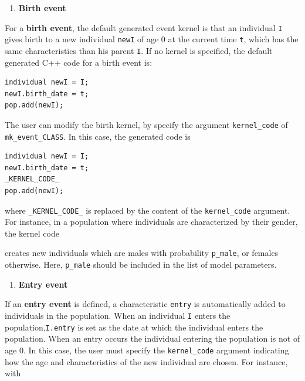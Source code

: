 \begin{enumerate}
\def\labelenumi{\arabic{enumi}.}
\setcounter{enumi}{2}
\tightlist
\item
  \textbf{Birth event}
\end{enumerate}

For a \textbf{birth event}, the default generated event kernel is that an individual \texttt{I} gives birth to a new individual \texttt{newI} of age 0 at the current time \texttt{t}, which has the same characteristics than his parent \texttt{I}. If no kernel is specified, the default generated C++ code for a birth event is:

\begin{verbatim}
individual newI = I;
newI.birth_date = t;
pop.add(newI);
\end{verbatim}

The user can modify the birth kernel, by specify the argument \texttt{kernel\_code} of \texttt{mk\_event\_CLASS}. In this case, the generated code is

\begin{verbatim}
individual newI = I;
newI.birth_date = t;
_KERNEL_CODE_
pop.add(newI);
\end{verbatim}

where \texttt{\_KERNEL\_CODE\_} is replaced by the content of the \texttt{kernel\_code} argument. For instance, in a population where individuals are characterized by their gender, the kernel code

\begin{Shaded}
\begin{Highlighting}[]
\end{Highlighting}
\end{Shaded}

creates new individuals which are males with probability \texttt{p\_male}, or females otherwise. Here, \texttt{p\_male} should be included in the list of model parameters.

\begin{enumerate}
\def\labelenumi{\arabic{enumi}.}
\setcounter{enumi}{3}
\tightlist
\item
  \textbf{Entry event}
\end{enumerate}

If an \textbf{entry event} is defined, a characteristic \texttt{entry} is automatically added to individuals in the population. When an individual \texttt{I} enters the population,\texttt{I.entry} is set as the date at which the individual enters the population.
When an entry occurs the individual entering the population is not of age \(0\). In this case, the user must specify the \texttt{kernel\_code} argument indicating how the age and characteristics of the new individual are chosen. For instance, with

